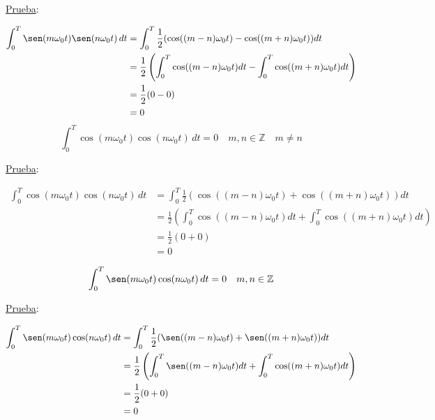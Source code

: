 \underline{Prueba}:

\begin{equation*}
\begin{split}
    \int_{0}^{T}\sen(m\omega_0 t)\sen(n\omega_0 t)\,dt
        &=\int_{0}^{T}\frac{1}{2}(\cos((m-n)\omega_0 t)-
          \cos((m+n)\omega_0 t))dt\\
        &=\frac{1}{2}\left(\int_{0}^{T}\cos((m-n)\omega_0 t)dt-
          \int_{0}^{T}\cos((m+n)\omega_0 t)dt\right)\\
        &=\frac{1}{2}(0-0)\\
        &=0\\
\end{split}
\end{equation*}
\begin{equation}
    \int_{0}^{T}\cos(m\omega_0 t)\cos(n\omega_0 t)\,dt=0
    \quad m,n \in\mathbb{Z}\quad m\neq n
\end{equation}

\underline{Prueba}:

\begin{equation*}
\begin{split}
    \int_{0}^{T}\cos(m\omega_0 t)\cos(n\omega_0 t)\,dt
        &=\int_{0}^{T}\frac{1}{2}(\cos((m-n)\omega_0 t)+
          \cos((m+n)\omega_0 t))dt\\
        &=\frac{1}{2}\left(\int_{0}^{T}\cos((m-n)\omega_0 t)dt+
          \int_{0}^{T}\cos((m+n)\omega_0 t)dt\right)\\
        &=\frac{1}{2}(0+0)\\
        &=0\\
\end{split}
\end{equation*}
\begin{equation}
    \int_{0}^{T}\sen(m\omega_0 t)\cos(n\omega_0 t)\,dt=0\quad m,n \in\mathbb{Z}
\end{equation}

\underline{Prueba}:

\begin{equation*}
\begin{split}
    \int_{0}^{T}\sen(m\omega_0 t)\cos(n\omega_0 t)\,dt
        &=\int_{0}^{T}\frac{1}{2}(\sen((m-n)\omega_0 t)+
          \sen((m+n)\omega_0 t))dt\\
        &=\frac{1}{2}\left(\int_{0}^{T}\sen((m-n)\omega_0 t)dt+
          \int_{0}^{T}\cos((m+n)\omega_0 t)dt\right)\\
        &=\frac{1}{2}(0+0)\\
        &=0\\
\end{split}
\end{equation*}

